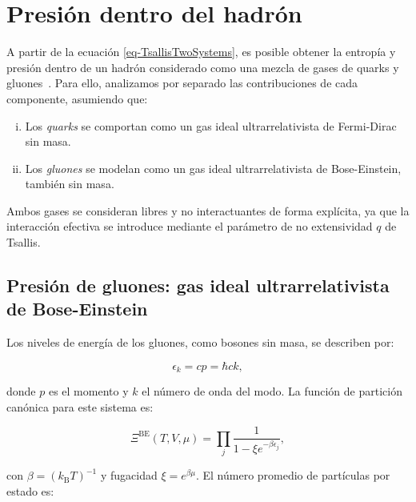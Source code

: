 \section{Presión dentro del hadrón}
\label{sec-PresTsa}

A partir de la ecuación \eqref{eq-TsallisTwoSystems}, es posible obtener la entropía y presión dentro de un hadrón considerado como una mezcla de gases de quarks y gluones\ \cite{Greiner2001}. Para ello, analizamos por separado las contribuciones de cada componente, asumiendo que:

\begin{enumerate}[i.]
    \item Los \emph{quarks} se comportan como un gas ideal ultrarrelativista de Fermi-Dirac sin masa.
    \item Los \emph{gluones} se modelan como un gas ideal ultrarrelativista de Bose-Einstein, también sin masa.
\end{enumerate}

Ambos gases se consideran libres y no interactuantes de forma explícita, ya que la interacción efectiva se introduce mediante el parámetro de no extensividad \( q \) de Tsallis.

\subsection{Presión de gluones: gas ideal ultrarrelativista de Bose-Einstein}

Los niveles de energía de los gluones, como bosones sin masa, se describen por:

\begin{equation}
\epsilon_k = c p = \hbar c k,
\end{equation}

donde \( p \) es el momento y \( k \) el número de onda del modo. La función de partición canónica para este sistema es:

\begin{equation}\label{eq-partfunc}
\Xi^{\mathrm{BE}}(T,V,\mu) = \prod_j \frac{1}{1 - \xi e^{-\beta \epsilon_j}},
\end{equation}

con \( \beta = ({k}_{\mathrm{B}} T)^{-1} \) y fugacidad \( \xi = e^{\beta \mu} \). El número promedio de partículas por estado es:

